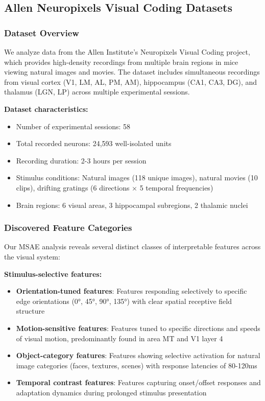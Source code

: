 \subsection{Allen Neuropixels Visual Coding Datasets}

\subsubsection{Dataset Overview}

We analyze data from the Allen Institute's Neuropixels Visual Coding project, which provides high-density recordings from multiple brain regions in mice viewing natural images and movies. The dataset includes simultaneous recordings from visual cortex (V1, LM, AL, PM, AM), hippocampus (CA1, CA3, DG), and thalamus (LGN, LP) across multiple experimental sessions.

\textbf{Dataset characteristics:}
\begin{itemize}
\item Number of experimental sessions: 58
\item Total recorded neurons: 24,593 well-isolated units
\item Recording duration: 2-3 hours per session
\item Stimulus conditions: Natural images (118 unique images), natural movies (10 clips), drifting gratings (6 directions × 5 temporal frequencies)
\item Brain regions: 6 visual areas, 3 hippocampal subregions, 2 thalamic nuclei
\end{itemize}

\subsubsection{Discovered Feature Categories}

Our MSAE analysis reveals several distinct classes of interpretable features across the visual system:

\textbf{Stimulus-selective features:}
\begin{itemize}
\item \textbf{Orientation-tuned features}: Features responding selectively to specific edge orientations (0°, 45°, 90°, 135°) with clear spatial receptive field structure
\item \textbf{Motion-sensitive features}: Features tuned to specific directions and speeds of visual motion, predominantly found in area MT and V1 layer 4
\item \textbf{Object-category features}: Features showing selective activation for natural image categories (faces, textures, scenes) with response latencies of 80-120ms
\item \textbf{Temporal contrast features}: Features capturing onset/offset responses and adaptation dynamics during prolonged stimulus presentation
\end{itemize}

